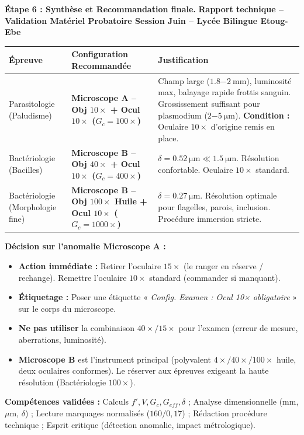 \documentclass[11pt]{article}
\begin{document}
\begin{exoresolu}
\medskip
\noindent \textbf{Étape 6 : Synthèse et Recommandation finale.}
\medskip
\noindent \textbf{Rapport technique -- Validation Matériel Probatoire Session Juin -- Lycée Bilingue Etoug-Ebe}

\begin{aretenir}
\begin{center}
\begin{tabularx}{\linewidth}{|l|X|X|}\hline
\textbf{Épreuve} & \textbf{Configuration Recommandée} & \textbf{Justification} \\ \hline
Parasitologie (Paludisme) & \textbf{Microscope A -- Obj $10\times$ + Ocul $10\times$ ($G_c=100\times$)} & Champ large ($\SI{1,8-2}{\mm}$), luminosité max, balayage rapide frottis sanguin. Grossissement suffisant pour plasmodium ($\SI{2-5}{\um}$). \textbf{Condition :} Oculaire $10\times$ d'origine remis en place. \\ \hline
Bactériologie (Bacilles) & \textbf{Microscope B -- Obj $40\times$ + Ocul $10\times$ ($G_c=400\times$)} & $\delta = \SI{0,52}{\um} \ll \SI{1,5}{\um}$. Résolution confortable. Oculaire $10\times$ standard. \\ \hline
Bactériologie (Morphologie fine) & \textbf{Microscope B -- Obj $100\times$ Huile + Ocul $10\times$ ($G_c=1000\times$)} & $\delta = \SI{0,27}{\um}$. Résolution optimale pour flagelles, parois, inclusion. Procédure immersion stricte. \\ \hline
\end{tabularx}
\end{center}
\end{aretenir}

\medskip
\noindent \textbf{Décision sur l'anomalie Microscope A :}
\begin{itemize}
    \item \textbf{Action immédiate :} Retirer l'oculaire $15\times$ (le ranger en réserve / rechange). Remettre l'oculaire $10\times$ standard (commander si manquant).
    \item \textbf{Étiquetage :} Poser une étiquette « \emph{Config. Examen : Ocul 10× obligatoire} » sur le corps du microscope.
    \item \textbf{Ne pas utiliser} la combinaison $40\times/15\times$ pour l'examen (erreur de mesure, aberrations, luminosité).
    \item \textbf{Microscope B} est l'instrument principal (polyvalent $4\times/40\times/100\times$ huile, deux oculaires conformes). Le réserver aux épreuves exigeant la haute résolution (Bactériologie $100\times$).
\end{itemize}

\medskip
\noindent \textbf{Compétences validées :} Calculs $f', V, G_c, G_{eff}, \delta$ ; Analyse dimensionnelle (mm, $\mu$m, $\delta$) ; Lecture marquages normalisés ($160/0,17$) ; Rédaction procédure technique ; Esprit critique (détection anomalie, impact métrologique).
\end{exoresolu}
\end{document}
